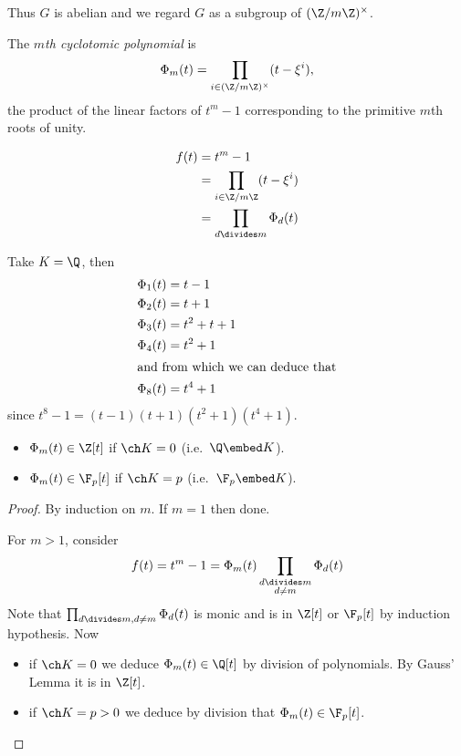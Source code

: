 \documentclass[a4paper]{article}
\begin{document}
Thus \(G\) is abelian and we regard \(G\) as a subgroup of \((\Z/m\Z)^\times\).

\begin{definition}
  The \emph{\(m\)th cyclotomic polynomial} is
  \[
    \Phi_m(t) = \prod_{i \in (\Z/m\Z)^\times} (t - \xi^i),
  \]
  the product of the linear factors of \(t^m - 1\) corresponding to the primitive \(m\)th roots of unity.
\end{definition}

\begin{remark}
  \begin{align*}
    f(t) &= t^m - 1 \\
         &= \prod_{i \in \Z/m\Z} (t - \xi^i) \\
         &= \prod_{d \divides m} \Phi_d(t)
  \end{align*}
\end{remark}

\begin{eg}
  Take \(K = \Q\), then
  \begin{align*}
    \Phi_1(t) &= t - 1 \\
    \Phi_2(t) &= t + 1 \\
    \Phi_3(t) &= t^2 + t + 1 \\
    \Phi_4(t) &= t^2 + 1 \\
    \intertext{and from which we can deduce that}
    \Phi_8(t) &= t^4 + 1
  \end{align*}
  since \(t^8 - 1 = (t - 1)(t + 1)(t^2 + 1)(t^4 + 1)\).
\end{eg}

\begin{lemma}\leavevmode
  \begin{itemize}
  \item \(\Phi_m(t) \in \Z[t]\) if \(\ch K = 0\) (i.e.\ \(\Q \embed K\)).
  \item \(\Phi_m(t) \in \F_p[t]\) if \(\ch K = p\) (i.e.\ \(\F_p \embed K\)).
  \end{itemize}
\end{lemma}

\begin{proof}
  By induction on \(m\). If \(m = 1\) then done.

  For \(m > 1\), consider
  \[
    f(t) = t^m - 1 =\Phi_m(t) \prod_{\substack{d \divides m \\ d \neq m}} \Phi_d(t)
  \]
  Note that \(\prod_{d \divides m, d \neq m} \Phi_d(t)\) is monic and is in \(\Z[t]\) or \(\F_p[t]\) by induction hypothesis. Now
  \begin{itemize}
  \item if \(\ch K = 0\) we deduce \(\Phi_m(t) \in \Q[t]\) by division of polynomials. By Gauss' Lemma it is in \(\Z[t]\).
  \item if \(\ch K = p > 0\) we deduce by division that \(\Phi_m(t) \in \F_p[t]\).
  \end{itemize}
\end{proof}
\end{document}
